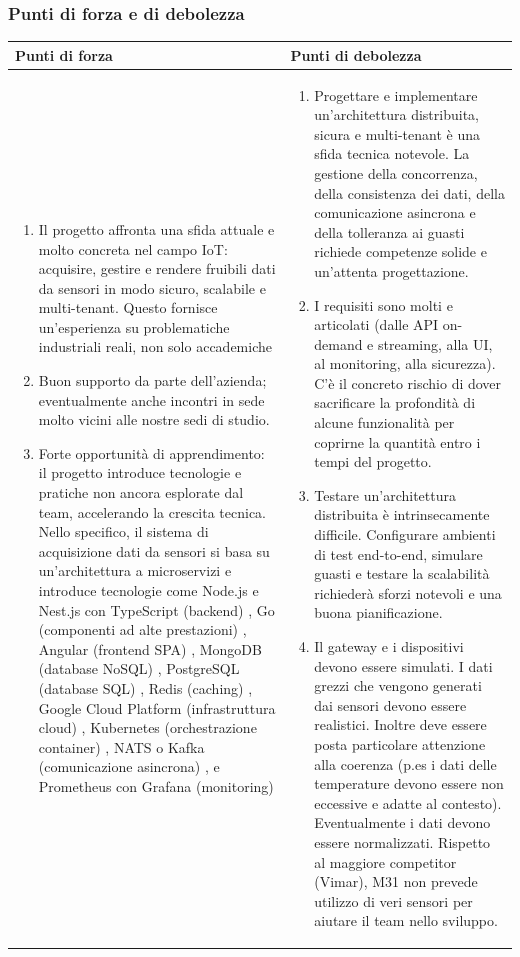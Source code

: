 \documentclass[a4paper,11pt]{article}
\begin{document}
\subsubsection{Punti di forza e di debolezza}
{\footnotesize
\begin{tabularx}{\textwidth}{|X|X|}
\hline
\rowcolor{lightgray!40} %
\textbf{Punti di forza} & \textbf{Punti di debolezza} \\
\hline
\begin{enumerate}
\item  Il progetto affronta una sfida attuale e molto concreta nel campo IoT: acquisire, gestire e rendere fruibili dati da sensori in modo sicuro, scalabile e multi-tenant. Questo fornisce un'esperienza su problematiche industriali reali, non solo accademiche
\item Buon supporto da parte dell'azienda; eventualmente anche incontri in sede molto vicini alle nostre sedi di studio.
\item Forte opportunità di apprendimento: il progetto introduce tecnologie e pratiche non ancora esplorate dal team, accelerando la crescita tecnica. Nello specifico, il sistema di acquisizione dati da sensori si basa su un'architettura a microservizi e introduce tecnologie come Node.js e Nest.js con TypeScript (backend) , Go (componenti ad alte prestazioni) , Angular (frontend SPA) , MongoDB (database NoSQL) , PostgreSQL (database SQL) , Redis (caching) , Google Cloud Platform (infrastruttura cloud) , Kubernetes (orchestrazione container) , NATS o Kafka (comunicazione asincrona) , e Prometheus con Grafana (monitoring)
\end{enumerate}
 & \begin{enumerate}
\item Progettare e implementare un'architettura distribuita, sicura e multi-tenant è una sfida tecnica notevole. La gestione della concorrenza, della consistenza dei dati, della comunicazione asincrona e della tolleranza ai guasti richiede competenze solide e un'attenta progettazione.
\item 	I requisiti sono molti e articolati (dalle API on-demand e streaming, alla UI, al monitoring, alla sicurezza). C'è il concreto rischio di dover sacrificare la profondità di alcune funzionalità per coprirne la quantità entro i tempi del progetto.
\item Testare un'architettura distribuita è intrinsecamente difficile. Configurare ambienti di test end-to-end, simulare guasti e testare la scalabilità richiederà sforzi notevoli e una buona pianificazione.
\item  Il gateway e i dispositivi devono essere simulati. I dati grezzi che vengono generati dai sensori devono essere realistici. Inoltre deve essere posta particolare attenzione alla coerenza (p.es i dati delle temperature devono essere non eccessive e adatte al contesto). Eventualmente i dati devono essere normalizzati. Rispetto al maggiore competitor (Vimar), M31 non prevede utilizzo di veri sensori per aiutare il team nello sviluppo.
\end{enumerate} \\
\hline
\end{tabularx}
}
\end{document}
